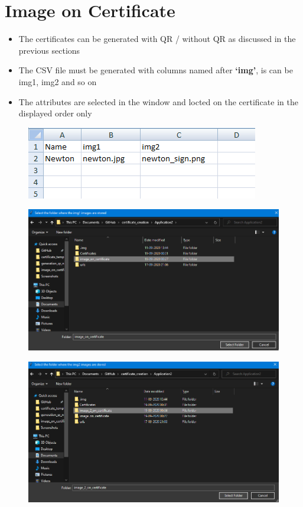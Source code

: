 \chapter{Image on Certificate}

\begin{itemize}
	\item The certificates can be generated with QR / without QR as discussed in the previous sections
	\item The CSV file must be generated with columns named after \textbf{`img'}, is can be img1, img2 and so on
	\item The attributes are selected in the window and locted on the certificate in the displayed order only
\end{itemize}

\begin{figure}[H]
	\centering
	\includegraphics[width=0.7\linewidth]{"images/image_on_cert/Screenshot (84)"}
	\label{fig:screenshot-84}
\end{figure}
\begin{figure}[H]
	\centering
	\includegraphics[width=0.85\linewidth]{"images/image_on_cert/Screenshot (93)"}
	\label{fig:screenshot-93}
\end{figure}
\begin{figure}[H]
	\centering
	\includegraphics[width=0.8\linewidth]{"images/image_on_cert/Screenshot (94)"}
	\label{fig:screenshot-94}
\end{figure}

